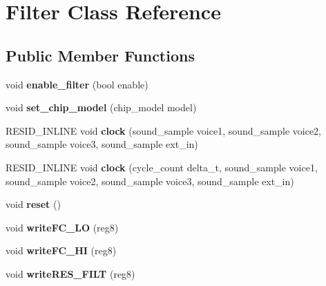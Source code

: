 \hypertarget{classFilter}{\section{Filter Class Reference}
\label{classFilter}
}
\subsection*{Public Member Functions}
\begin{DoxyCompactItemize}
\item 
\hypertarget{classFilter_a7c6a4d19630094c500bf3e608fcc5beb}{void {\bfseries enable\-\_\-filter} (bool enable)}\label{classFilter_a7c6a4d19630094c500bf3e608fcc5beb}

\item 
\hypertarget{classFilter_a0bf566ec400ff7cfa85ccf1de9eabf62}{void {\bfseries set\-\_\-chip\-\_\-model} (chip\-\_\-model model)}\label{classFilter_a0bf566ec400ff7cfa85ccf1de9eabf62}

\item 
\hypertarget{classFilter_a3f7aa2edff0ae796a080bb7db0e24645}{R\-E\-S\-I\-D\-\_\-\-I\-N\-L\-I\-N\-E void {\bfseries clock} (sound\-\_\-sample voice1, sound\-\_\-sample voice2, sound\-\_\-sample voice3, sound\-\_\-sample ext\-\_\-in)}\label{classFilter_a3f7aa2edff0ae796a080bb7db0e24645}

\item 
\hypertarget{classFilter_ad4364548104157f6344fd24943ed00d2}{R\-E\-S\-I\-D\-\_\-\-I\-N\-L\-I\-N\-E void {\bfseries clock} (cycle\-\_\-count delta\-\_\-t, sound\-\_\-sample voice1, sound\-\_\-sample voice2, sound\-\_\-sample voice3, sound\-\_\-sample ext\-\_\-in)}\label{classFilter_ad4364548104157f6344fd24943ed00d2}

\item 
\hypertarget{classFilter_aea4a28f5eaf6264a5732ed0d6730fa20}{void {\bfseries reset} ()}\label{classFilter_aea4a28f5eaf6264a5732ed0d6730fa20}

\item 
\hypertarget{classFilter_aaa4c0c01db2af9cbb958a85548fbbd48}{void {\bfseries write\-F\-C\-\_\-\-L\-O} (reg8)}\label{classFilter_aaa4c0c01db2af9cbb958a85548fbbd48}

\item 
\hypertarget{classFilter_a90104a8568ee833c71da28ceae3eae00}{void {\bfseries write\-F\-C\-\_\-\-H\-I} (reg8)}\label{classFilter_a90104a8568ee833c71da28ceae3eae00}

\item 
\hypertarget{classFilter_ab243fc0e89c94b36654a78ac63a68711}{void {\bfseries write\-R\-E\-S\-\_\-\-F\-I\-L\-T} (reg8)}\label{classFilter_ab243fc0e89c94b36654a78ac63a68711}


\end{DoxyCompactItemize}
